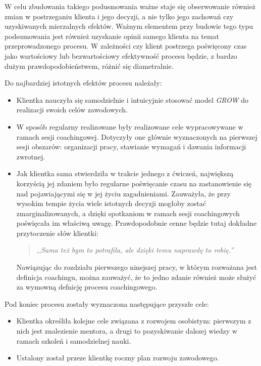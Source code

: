 W celu zbudowania takiego podusmowania ważne staje się obserwowanie również zmian w postrzeganiu klienta i jego decyzji, a nie tylko jego zachowań
czy uzyskiwanych mierzalnych efektów. Ważnym elementem przy budowie tego typu podsumowania jest również uzyskanie opinii samego klienta na temat
przeprowadzonego procesu. W zależności czy klient postrzega poświęcony czas jako wartościowy lub bezwartościowy efektywność procesu będzie,
z bardzo dużym prawdopodobieństwem, różnić się diametralnie.

Do najbardziej istotnych efektów procesu należały:
\begin{itemize}
  \item Klientka nauczyła się samodzielnie i intuicyjnie stosować model \emph{GROW} do realizacji swoich celów zawodowych.
  \item W sposób regularny realizowane były realizowane cele wypracowywane w ramach sesji coachingowej. Dotyczyły one głównie wyznaczonych na
      pierwszej sesji obszarów: organizacji pracy, stawianie wymagań i dawania informacji zwrotnej.
  \item Jak klientka sama stwierdziła w trakcie jednego z ćwiczeń, największą korzyścią jej zdaniem było regularne poświęcanie czasu na zastanowienie
      się nad pojawiającymi się w jej życiu zagadnieniami. Zauważyła, że przy wysokim tempie życia wiele istotnych decyzji mogłoby zostać zmarginalizowanych,
      a dzięki spotkaniom w ramach sesji coachingowych poświęcała im właściwą uwagę. Prawdopodobnie cenne będzie tutaj dokładne przytoczenie słów klientki:
      \begin{quote}
      \centering
      \emph{,,Sama też bym to potrafiła, ale dzięki temu naprawdę to robię.''}
      \end{quote}
      Nawiązując do rozdziału pierwszego ninejszej pracy, w którym rozważana jest definicja coachingu, można zauważyć, że to jedno zdanie również
      może służyć za wymowną defnicję procesu coachingowego.
\end{itemize}

Pod koniec procesu zostały wyznaczona następujące przyszłe cele:
\begin{itemize}
  \item Klientka określiła kolejne cele związana z rozwojem osobistym: pierwszym z nich jest znalezienie mentora, a drugi to pozyskiwanie dalszej wiedzy
      w ramach szkoleń i samodzielnej nauki.
  \item Ustalony został przeze klientkę roczny plan rozwoju zawodowego.
\end{itemize}


